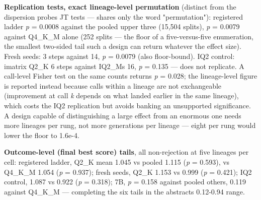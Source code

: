 \textbf{Replication tests, exact lineage-level permutation} (distinct from the dispersion probes\textquotesingle{} JT tests --- shares only the word "permutation"): registered ladder \emph{p} = 0.0008 against the pooled upper three (15,504 splits), \emph{p} = 0.0079 against Q4\_K\_M alone (252 splits --- the floor of a five-versus-five enumeration, the smallest two-sided tail such a design can return whatever the effect size). Fresh seeds: 3 steps against 14, \emph{p} = 0.0079 (also floor-bound). IQ2 control: imatrix Q2\_K 6 steps against IQ2\_M\textquotesingle s 16, \emph{p} = 0.135 --- does not replicate. A call-level Fisher test on the same counts returns \emph{p} = 0.028; the lineage-level figure is reported instead because calls within a lineage are not exchangeable (improvement at call \emph{k} depends on what landed earlier in the same lineage), which costs the IQ2 replication but avoids banking an unsupported significance. A design capable of distinguishing a large effect from an enormous one needs more lineages per rung, not more generations per lineage --- eight per rung would lower the floor to 1.6e-4.

\textbf{Outcome-level (final best score) tails}, all non-rejection at five lineages per cell: registered ladder, Q2\_K mean 1.045 vs pooled 1.115 (\emph{p} = 0.593), vs Q4\_K\_M 1.054 (\emph{p} = 0.937); fresh seeds, Q2\_K 1.153 vs 0.999 (\emph{p} = 0.421); IQ2 control, 1.087 vs 0.922 (\emph{p} = 0.318); 7B, \emph{p} = 0.158 against pooled others, 0.119 against Q4\_K\_M --- completing the six tails in the abstract\textquotesingle s 0.12-0.94 range.

